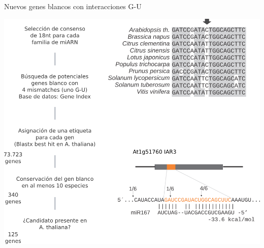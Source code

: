 \documentclass{beamer}
\begin{document}
\begin{frame}{Nuevos genes blancos con interacciones G-U}
	\begin{center}
		\includegraphics[width=.6\textwidth]{img/Figure5_retocada.png}
	\end{center}
\end{frame}
\end{document}
